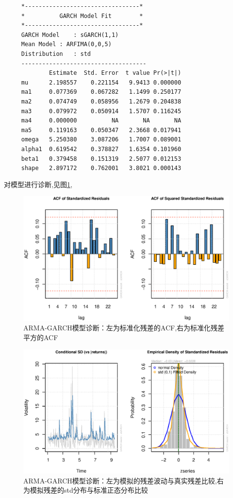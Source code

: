 \begin{framed}
	\begin{verbatim}
	 *---------------------------------*                         
	 *          GARCH Model Fit        *                           
	 *---------------------------------*
	 GARCH Model	: sGARCH(1,1)
	 Mean Model	: ARFIMA(0,0,5)
	 Distribution	: std 
	 ------------------------------------
	         Estimate  Std. Error  t value Pr(>|t|)
	 mu      2.198557    0.221154   9.9413 0.000000                                  
	 ma1     0.077369    0.067282   1.1499 0.250177
	 ma2     0.074749    0.058956   1.2679 0.204838
	 ma3     0.079972    0.050914   1.5707 0.116245
	 ma4     0.000000          NA       NA       NA
	 ma5     0.119163    0.050347   2.3668 0.017941
	 omega   5.250380    3.087206   1.7007 0.089001
	 alpha1  0.619542    0.378827   1.6354 0.101960
	 beta1   0.379458    0.151319   2.5077 0.012153
	 shape   2.897172    0.762001   3.8021 0.000143
	\end{verbatim}
\end{framed}
对模型进行诊断,见图\ref{fig:diagarch},
\begin{figure}[h!]
	\centering
	\includegraphics[width=0.7\linewidth]{pic/ast/diagarch}
	\caption{ARMA-GARCH模型诊断：左为标准化残差的ACF,右为标准化残差平方的ACF}
	\label{fig:diagarch}
\end{figure}
\begin{figure}[h!]
	\centering
	\includegraphics[width=0.6\linewidth]{pic/ast/diav}
	\caption{ARMA-GARCH模型诊断：左为模拟的残差波动与真实残差比较,右为模拟残差的std分布与标准正态分布比较}
	\label{fig:diav}
\end{figure}
